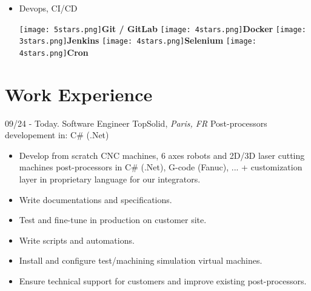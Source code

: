 \documentclass[]{friggeri-cv}
\begin{document}
\begin{flushleft}
\begin{multicols}{3}
\begin{itemize}
\item \large Devops, CI/CD \
\normalsize
\begin{flushleft}

\texttt{[image: 5stars.png]}\hspace{1.5mm}\textbf{Git / GitLab}
\texttt{[image: 4stars.png]}\hspace{1.5mm}\textbf{Docker}
\texttt{[image: 3stars.png]}\hspace{1.5mm}\textbf{Jenkins}
\texttt{[image: 4stars.png]}\hspace{1.5mm}\textbf{Selenium}
\texttt{[image: 4stars.png]}\hspace{1.5mm}\textbf{Cron}
\end{flushleft}            


        \end{itemize}
        \end{multicols}
        \end{flushleft} \normalsize
        \vspace*{-0.65cm}
\section{Work Experience}
\vspace*{-0.25cm}

\begin{entrylist}
  \entry
    {09/24 - Today.}
    {Software Engineer}
    {TopSolid, \textit{Paris, FR}}
    {Post-processors developement in: C\# (.Net)}
\end{entrylist}
\vspace{-15pt}

\vspace{0.5mm}
\begin{itemize}
\setlength{\itemsep}{1pt}
\setlength{\parskip}{0pt}
\setlength{\parsep}{0pt}

\item Develop from scratch CNC machines, 6 axes robots and 2D/3D laser cutting machines post-processors in C\# (.Net), G-code (Fanuc), ... + customization layer in proprietary language for our integrators.
\item Write documentations and specifications.
\item Test and fine-tune in production on customer site.
\item Write scripts and automations.
\item Install and configure test/machining simulation virtual machines.
\item Ensure technical support for customers and improve existing post-processors.
\end{itemize}
\end{document}
